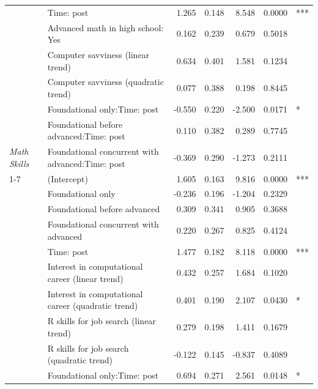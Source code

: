 \begin{table}[!h]
\begin{threeparttable}
\begin{tabular}[t]{>{}llrrrrl}
 & Time: post & 1.265 & 0.148 & 8.548 & 0.0000 & ***\\

 & Advanced math in high school: Yes & 0.162 & 0.239 & 0.679 & 0.5018 & \\

 & Computer savviness (linear trend) & 0.634 & 0.401 & 1.581 & 0.1234 & \\

 & Computer savviness (quadratic trend) & 0.077 & 0.388 & 0.198 & 0.8445 & \\

 & Foundational only:Time: post & -0.550 & 0.220 & -2.500 & 0.0171 & *\\

 & Foundational before advanced:Time: post & 0.110 & 0.382 & 0.289 & 0.7745 & \\

\multirow[t]{-10}{*}[\normalbaselineskip]{\raggedright\arraybackslash \em{Math Skills}} & Foundational concurrent with advanced:Time: post & -0.369 & 0.290 & -1.273 & 0.2111 & \\
\cmidrule{1-7}
 & (Intercept) & 1.605 & 0.163 & 9.816 & 0.0000 & ***\\

 & Foundational only & -0.236 & 0.196 & -1.204 & 0.2329 & \\

 & Foundational before advanced & 0.309 & 0.341 & 0.905 & 0.3688 & \\

 & Foundational concurrent with advanced & 0.220 & 0.267 & 0.825 & 0.4124 & \\

 & Time: post & 1.477 & 0.182 & 8.118 & 0.0000 & ***\\

 & Interest in computational career (linear trend) & 0.432 & 0.257 & 1.684 & 0.1020 & \\

 & Interest in computational career (quadratic trend) & 0.401 & 0.190 & 2.107 & 0.0430 & *\\

 & R skills for job search (linear trend) & 0.279 & 0.198 & 1.411 & 0.1679 & \\

 & R skills for job search (quadratic trend) & -0.122 & 0.145 & -0.837 & 0.4089 & \\

 & Foundational only:Time: post & 0.694 & 0.271 & 2.561 & 0.0148 & *\\


\end{tabular}
\end{threeparttable}
\end{table}
